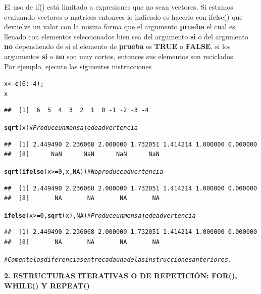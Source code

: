 \documentclass[12pt,letterpaper]{article}\usepackage[]{graphicx}\usepackage[]{color}
\makeatletter
\newcommand{\hlnum}[1]{\textcolor[rgb]{0.686,0.059,0.569}{#1}}%
\newcommand{\hlcom}[1]{\textcolor[rgb]{0.678,0.584,0.686}{\textit{#1}}}%
\newcommand{\hlopt}[1]{\textcolor[rgb]{0,0,0}{#1}}%
\newcommand{\hlstd}[1]{\textcolor[rgb]{0.345,0.345,0.345}{#1}}%
\newcommand{\hlkwb}[1]{\textcolor[rgb]{0.69,0.353,0.396}{#1}}%
\newcommand{\hlkwd}[1]{\textcolor[rgb]{0.737,0.353,0.396}{\textbf{#1}}}%
\newenvironment{kframe}{%
 \def\at@end@of@kframe{}%
 \ifinner\ifhmode%
  \def\at@end@of@kframe{\end{minipage}}%
  \begin{minipage}{\columnwidth}%
 \fi\fi%
 \def\FrameCommand##1{\hskip\@totalleftmargin \hskip-\fboxsep
 \colorbox{shadecolor}{##1}\hskip-\fboxsep
     \hskip-\linewidth \hskip-\@totalleftmargin \hskip\columnwidth}%
 \MakeFramed {\advance\hsize-\width
   \@totalleftmargin\z@ \linewidth\hsize
   \@setminipage}}%
 {\par\unskip\endMakeFramed%
 \at@end@of@kframe}
\newenvironment{knitrout}{}{} %
\makeatother
\begin{document}
El uso de if() est\'a limitado a expresiones que no sean vectores. Si estamos evaluando vectores o matrices entonces lo indicado es hacerlo con ifelse() que devuelve un valor con la misma forma que el argumento \textbf{prueba} el cual es llenado con elementos seleccionados bien sea del argumento \textbf{si} o del argumento \textbf{no} dependiendo de si el elemento de \textbf{prueba} es \textbf{TRUE} o \textbf{FALSE}, si los argumentos \textbf{si} o \textbf{no} son muy cortos, entonces sus elementos son reciclados.\\

Por ejemplo, ejecute las siguientes instrucciones
\begin{knitrout}
\color{fgcolor}\begin{kframe}
\begin{alltt}
\hlstd{x} \hlkwb{<-} \hlkwd{c}\hlstd{(}\hlnum{6}\hlopt{:-}\hlnum{4}\hlstd{);}
\hlstd{x}
\end{alltt}
\begin{verbatim}
##  [1]  6  5  4  3  2  1  0 -1 -2 -3 -4
\end{verbatim}
\begin{alltt}
\hlkwd{sqrt}\hlstd{(x)} \hlcom{# Produce un mensaje de advertencia}
\end{alltt}


{\ttfamily\noindent\color{warningcolor}{\#\# Warning in sqrt(x): Se han producido NaNs}}\begin{verbatim}
##  [1] 2.449490 2.236068 2.000000 1.732051 1.414214 1.000000 0.000000
##  [8]      NaN      NaN      NaN      NaN
\end{verbatim}
\begin{alltt}
\hlkwd{sqrt}\hlstd{(}\hlkwd{ifelse}\hlstd{(x} \hlopt{>=} \hlnum{0}\hlstd{, x,} \hlnum{NA}\hlstd{))} \hlcom{# No produce advertencia}
\end{alltt}
\begin{verbatim}
##  [1] 2.449490 2.236068 2.000000 1.732051 1.414214 1.000000 0.000000
##  [8]       NA       NA       NA       NA
\end{verbatim}
\begin{alltt}
\hlkwd{ifelse}\hlstd{(x} \hlopt{>=} \hlnum{0}\hlstd{,} \hlkwd{sqrt}\hlstd{(x),} \hlnum{NA}\hlstd{)} \hlcom{# Produce un mensaje de advertencia}
\end{alltt}


{\ttfamily\noindent\color{warningcolor}{\#\# Warning in sqrt(x): Se han producido NaNs}}\begin{verbatim}
##  [1] 2.449490 2.236068 2.000000 1.732051 1.414214 1.000000 0.000000
##  [8]       NA       NA       NA       NA
\end{verbatim}
\begin{alltt}
\hlcom{# Comente las diferencias entre cada una de las instrucciones anteriores.}
\end{alltt}
\end{kframe}
\end{knitrout}
\begin{center}
\textbf{2. ESTRUCTURAS ITERATIVAS O DE REPETICI\'ON: FOR(), WHILE() Y REPEAT()}
\end{center}
\end{document}
